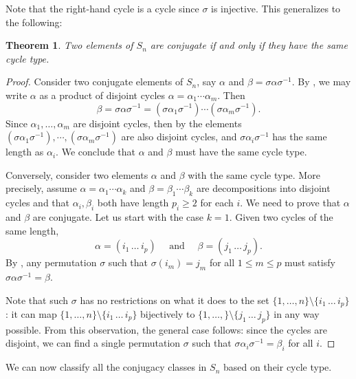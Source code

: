 \documentclass[12pt]{report}
\newtheorem{theorem}{Theorem}[chapter]
\numberwithin{equation}{section}
\numberwithin{theorem}{chapter}
\theoremstyle{definition}
\newtheorem*{basic properties}{Basic Properties}
\newtheorem*{Important Remark}{Important Remark}
\newcommand{\s}{\sigma}
\begin{document}
Note that the right-hand cycle is a cycle since $\sigma$ is injective. This generalizes to the following:

\begin{theorem}\label{conjugates S_n}
Two elements of $S_n$ are conjugate if and only if they have the same cycle type. 
\end{theorem}



\begin{proof}
Consider two conjugate elements of $S_n$, say $\alpha$ and $\beta = \s \alpha \s^{-1}$. By , we may write $\alpha$ as a product of disjoint cycles $\alpha = \alpha_1 \cdots \alpha_m$. Then 
$$\beta = \s \alpha \s^{-1} = (\s \alpha_1 \s^{-1})  \cdots (\s \alpha_m \s^{-1}).$$ 
Since $\alpha_1, \ldots, \alpha_m$ are disjoint cycles, then by  the elements $(\s \alpha_1 \s^{-1}),   \cdots, (\s \alpha_m \s^{-1})$ are also disjoint cycles, and $\s \alpha_i \s^{-1}$ has the same length as $\alpha_i$.
We conclude that $\alpha$ and $\beta$ must have the same cycle type.

Conversely, consider two elements $\alpha$ and $\beta$ with the same cycle type. More precisely, assume $\alpha = \alpha_1 \cdots \alpha_k$ and $\beta = \beta_1 \cdots \beta_k$ are decompositions into disjoint cycles and that $\alpha_i, \beta_i$ both have length $p_i \geqslant 2$ for each $i$. We need to prove that $\alpha$ and $\beta$ are conjugate. Let us start with the case $k = 1$. Given two cycles of the same length,
$$\alpha = (i_1 \, \dots \, i_p) \quad \text{ and } \quad \beta = (j_1 \, \dots \, j_p).$$
By , any permutation $\s$ such that $\s(i_m) = j_m$ for all $1 \leqslant m \leqslant p$ must satisfy $\s \alpha \s^{-1} = \beta$. 


Note that such $\s$ has no restrictions on what it does to the set $\{1, \dots, n\} \setminus \{i_1 \, \dots \, i_p\}$: it can map $\{1, \dots, n\} \setminus \{i_1 \, \dots \, i_p\}$ bijectively to $\{1, \dots, \} \setminus \{j_1 \, \dots \, j_p\}$ in any way possible. From this observation, the general case follows: since the cycles are disjoint, we can find a single permutation $\s$ such that $\s \alpha_i \s^{-1} = \beta_i$ for all $i$.
\end{proof}

We can now classify all the conjugacy classes in $S_n$ based on their cycle type.
\end{document}
